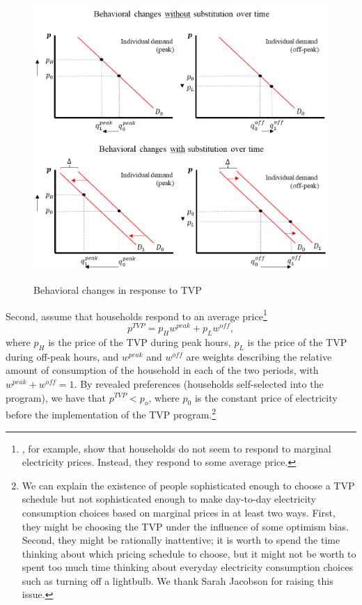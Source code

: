 \documentclass[12pt]{article}
\begin{document}
\begin{figure}[ht]
  \caption{Behavioral changes in response to TVP}\label{fig:four}
  \begin{center}
  {\includegraphics[width=1\textwidth]{./figures/image4.png}}
  \end{center}
\end{figure}

Second, assume that households respond to an average price\footnote{ \citet{itoConsumersRespondMarginal2014}, for example, show that households do not seem to respond to marginal electricity prices. Instead, they respond to some average price.}
\begin{equation}
	p^{TVP} = p_{H} w^{peak} + p_{L} w^{off},
\end{equation}
where $p_{H}$ is the price of the TVP during peak hours, $p_{L}$ is the price of the TVP during off-peak hours, and $w^{peak}$ and $w^{off}$ are weights describing the relative amount of consumption of the household in each of the two periods, with $w^{peak} + w^{off} = 1$. By revealed preferences (households self-selected into the program), we have that $p^{TVP} < p_{o}$, where $p_{0}$ is the constant price of electricity before the implementation of the TVP program.\footnote{We can explain the existence of people sophisticated enough to choose a TVP schedule but not sophisticated enough to make day-to-day electricity consumption choices based on marginal prices in at least two ways. First, they might be choosing the TVP under the influence of some optimism bias. Second, they might be rationally inattentive; it is worth to spend the time thinking about which pricing schedule to choose, but it might not be worth to spent too much time thinking about everyday electricity consumption choices such as turning off a lightbulb. We thank Sarah Jacobson for raising this issue.}
\end{document}
